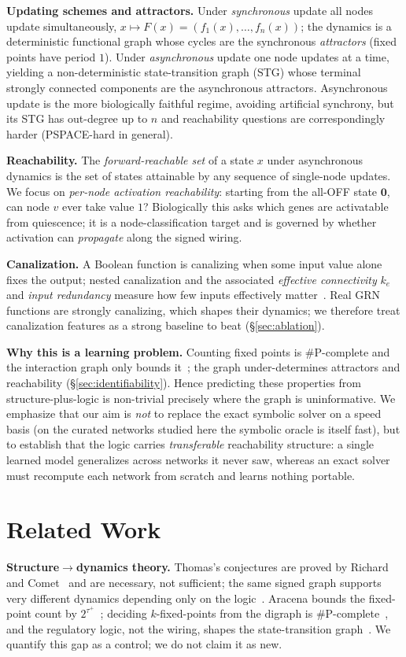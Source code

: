 \documentclass[journal]{IEEEtran}
\begin{document}
\textbf{Updating schemes and attractors.} Under \emph{synchronous} update all nodes
update simultaneously, $x\mapsto F(x)=(f_1(x),\dots,f_n(x))$; the dynamics is a
deterministic functional graph whose cycles are the synchronous \emph{attractors}
(fixed points have period $1$). Under \emph{asynchronous} update one node updates at a
time, yielding a non-deterministic state-transition graph (STG) whose terminal
strongly connected components are the asynchronous attractors. Asynchronous update is
the more biologically faithful regime, avoiding artificial synchrony, but its STG has
out-degree up to $n$ and reachability questions are correspondingly harder (PSPACE-hard
in general).

\textbf{Reachability.} The \emph{forward-reachable set} of a state $x$ under
asynchronous dynamics is the set of states attainable by any sequence of single-node
updates. We focus on \emph{per-node activation reachability}: starting from the all-OFF
state $\mathbf 0$, can node $v$ ever take value $1$? Biologically this asks which genes
are activatable from quiescence; it is a node-classification target and is governed by
whether activation can \emph{propagate} along the signed wiring.

\textbf{Canalization.} A Boolean function is canalizing when some input value alone
fixes the output; nested canalization and the associated \emph{effective connectivity}
$k_e$ and \emph{input redundancy} measure how few inputs effectively
matter~\cite{cana}. Real GRN functions are strongly canalizing, which shapes their
dynamics; we therefore treat canalization features as a strong baseline to beat
(\S\ref{sec:ablation}).

\textbf{Why this is a learning problem.} Counting fixed points is \#P-complete and the
interaction graph only bounds it~\cite{aracena2008,pcomplete}; the graph
under-determines attractors and reachability (\S\ref{sec:identifiability}). Hence
predicting these properties from structure-plus-logic is non-trivial precisely where
the graph is uninformative. We emphasize that our aim is \emph{not} to replace the exact
symbolic solver on a speed basis (on the curated networks studied here the symbolic
oracle is itself fast), but to establish that the logic carries \emph{transferable}
reachability structure: a single learned model generalizes across networks it never
saw, whereas an exact solver must recompute each network from scratch and learns
nothing portable.

\section{Related Work}
\textbf{Structure$\to$dynamics theory.} Thomas's conjectures are proved by Richard and
Comet~\cite{richard2007} and are necessary, not sufficient; the same signed graph
supports very different dynamics depending only on the logic~\cite{thomasreview}.
Aracena bounds the fixed-point count by $2^{\tau^+}$~\cite{aracena2008}; deciding
$k$-fixed-points from the digraph is \#P-complete~\cite{pcomplete}, and the regulatory
logic, not the wiring, shapes the state-transition graph~\cite{sil2024}. We quantify
this gap as a control; we do not claim it as new.
\end{document}

